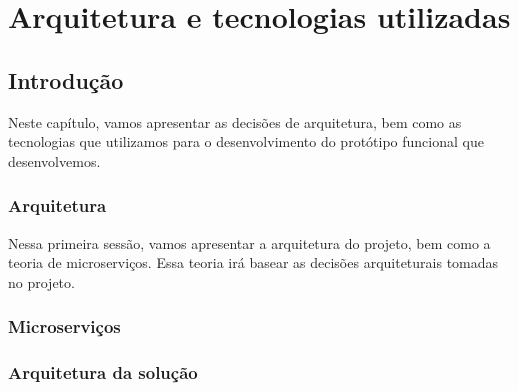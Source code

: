 \chapter{Arquitetura e tecnologias utilizadas}\label{chp:LABEL_CHP_4}


\section{Introdução}\label{sec:LABEL_CHP_4_SEC_A}

Neste capítulo, vamos apresentar as decisões de arquitetura, bem como as tecnologias que utilizamos para o desenvolvimento do protótipo funcional que desenvolvemos.


\subsection{Arquitetura}\label{sec:LABEL_CHP_4_SEC_B}

 Nessa primeira sessão, vamos apresentar a arquitetura do projeto, bem como a teoria de microserviços. Essa teoria irá basear as decisões arquiteturais tomadas no projeto.
 
\subsection{Microserviços}\label{sec:LABEL_CHP_4_SEC_B_SECSEC_A}
 


\subsection{Arquitetura da solução}\label{sec:LABEL_CHP_4_SEC_B_SECSEC_B}


